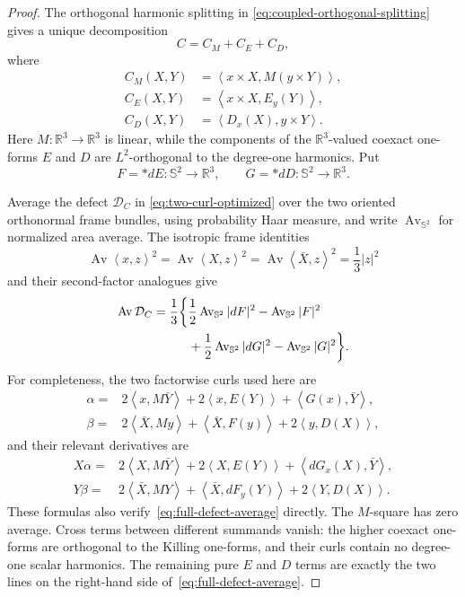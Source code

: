 \documentclass[11pt]{amsart}
\theoremstyle{definition}
\theoremstyle{remark}
\newcommand{\R}{\mathbb R}
\newcommand{\Sph}{\mathbb S}
\newcommand{\ip}[2]{\left\langle #1,#2\right\rangle}
\begin{document}
\begin{proof}
The orthogonal harmonic splitting in
\eqref{eq:coupled-orthogonal-splitting} gives a unique decomposition
\begin{equation}\label{eq:full-harmonic-decomposition}
 C=C_M+C_E+C_D,
\end{equation}
where
\begin{align*}
 C_M(X,Y)&=\ip{x\times X}{M(y\times Y)},\\
 C_E(X,Y)&=\ip{x\times X}{E_y(Y)},\\
 C_D(X,Y)&=\ip{D_x(X)}{y\times Y}.
\end{align*}
Here $M:\R^3\to\R^3$ is linear, while the components of the
$\R^3$-valued coexact one-forms $E$ and $D$ are $L^2$-orthogonal to
the degree-one harmonics.  Put
\[
 F=*dE:\Sph^2\to\R^3,
 \qquad
 G=*dD:\Sph^2\to\R^3.
\]

Average the defect $\mathcal D_C$ in
\eqref{eq:two-curl-optimized} over the two oriented orthonormal frame
bundles, using probability Haar measure, and write
$\operatorname{Av}_{\Sph^2}$ for normalized area average.  The
isotropic frame identities
\[
 \operatorname{Av}\ip{x}{z}^2
 =\operatorname{Av}\ip{X}{z}^2
 =\operatorname{Av}\ip{\bar X}{z}^2
 =\frac13|z|^2
\]
and their second-factor analogues give
\begin{align}
 \operatorname{Av}\mathcal D_C
 =\frac13\bigg\{&
 \frac12\operatorname{Av}_{\Sph^2}|dF|^2
 -\operatorname{Av}_{\Sph^2}|F|^2 \notag\\
 &+\frac12\operatorname{Av}_{\Sph^2}|dG|^2
 -\operatorname{Av}_{\Sph^2}|G|^2
 \bigg\}.                                      \label{eq:full-defect-average}
\end{align}
For completeness, the two factorwise curls used here are
\begin{align*}
 \alpha={}&2\ip{x}{M\bar Y}
            +2\ip{x}{E(Y)}+\ip{G(x)}{\bar Y},\\
 \beta={}&2\ip{\bar X}{My}
            +\ip{\bar X}{F(y)}+2\ip{y}{D(X)},
\end{align*}
and their relevant derivatives are
\begin{align*}
 X\alpha={}&2\ip{X}{M\bar Y}
              +2\ip{X}{E(Y)}+\ip{dG_x(X)}{\bar Y},\\
 Y\beta={}&2\ip{\bar X}{MY}
              +\ip{\bar X}{dF_y(Y)}+2\ip{Y}{D(X)}.
\end{align*}
These formulas also verify~\eqref{eq:full-defect-average} directly.
The $M$-square has zero average.  Cross terms between different
summands vanish: the higher coexact one-forms are orthogonal to the
Killing one-forms, and their curls contain no degree-one scalar
harmonics.  The remaining pure $E$ and $D$ terms are exactly the two
lines on the right-hand side of~\eqref{eq:full-defect-average}.


\end{proof}
\end{document}
